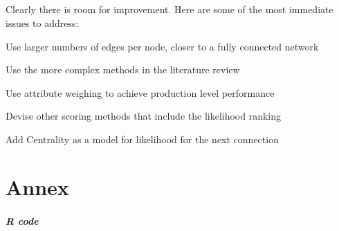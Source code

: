 \documentclass[12pt,a4paper]{report}
\begin{document}
\paragraph{} Clearly there is room for improvement. Here are some of the most immediate issues to address:
\begin{list}{•}{}
\item Use larger numbers of edges per node, closer to a fully connected network
\item Use the more complex methods in the literature review 
\item Use attribute weighing to achieve production level performance
\item Devise other scoring methods that include the likelihood ranking
\item Add Centrality as a model for likelihood for the next connection
\end{list}

\chapter{Annex}
\paragraph{R code}
\end{document}
